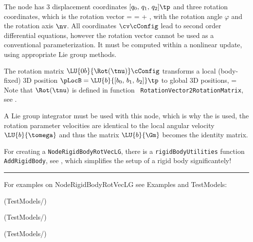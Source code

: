     The node has 3 displacement coordinates $[q_0,\,q_1,\,q_2]\tp$ and three rotation coordinates, which is the rotation vector 
    \be
      \tnu = \varphi \nv = \tnu\cConfig + \tnu\cRef,
    \ee
    with the rotation angle $\varphi$ and the rotation axis $\nv$.
    All coordinates $\cv\cConfig$ lead to second order differential equations, however the rotation vector cannot be used as a conventional parameterization. It must be computed within a nonlinear update, using appropriate Lie group methods.

    The rotation matrix $\LU{0b}{\Rot(\tnu)}\cConfig$ transforms a local (body-fixed) 3D position 
    $\pLocB = \LU{b}{[b_0,\,b_1,\,b_2]}\tp$ to global 3D positions,
    \be
      \cConfig = \cConfig {} 
    \ee
    Note that $\Rot(\tnu)$ is defined in function \texttt{ RotationVector2RotationMatrix}, see .
    
    A Lie group integrator must be used with this node, which is why the is used, the 
    rotation parameter velocities are identical to the local angular velocity $\LU{b}{\tomega}$ and thus the 
    matrix $ \LU{b}{\Gm}$ becomes the identity matrix.
    
    For creating a \texttt{NodeRigidBodyRotVecLG}, there is a \texttt{rigidBodyUtilities} function \texttt{AddRigidBody}, 
    see , which simplifies the setup of a rigid body significantely!
\vspace{6pt}\par\noindent\rule{\textwidth}{0.4pt}
%
\noindent For examples on NodeRigidBodyRotVecLG see Examples and TestModels:
\bi
\item {} (TestModels/)
\item {} (TestModels/)
\item {} (TestModels/)
\ei

